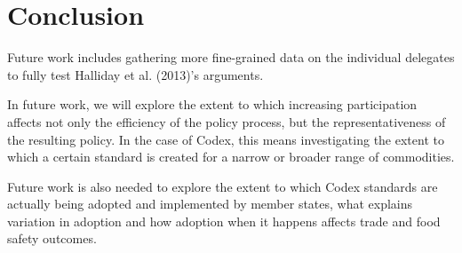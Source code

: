 \section*{Conclusion}


Future work includes gathering more fine-grained data on the individual delegates to fully test Halliday et al. (2013)'s arguments. 


In future work, we will explore the extent to which increasing participation affects not only the efficiency of the policy process, but the representativeness of the resulting policy. In the case of Codex, this means investigating the extent to which a certain standard is created for a narrow or broader range of commodities.  

Future work is also needed to explore the extent to which Codex standards are actually being adopted and implemented by member states, what explains variation in adoption and how adoption when it happens affects trade and food safety outcomes. 